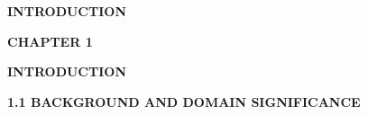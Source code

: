 \clearpage
{}
\setcounter{page}{1}
\pagestyle{fancy}
\fancyhf{}
\renewcommand{\headrulewidth}{0pt}
\cfoot{\fontsize{12pt}{14pt}\selectfont\thepage}

\vspace*{\fill}
\begin{center}
  {\fontsize{18pt}{24pt}\selectfont\bfseries INTRODUCTION\par}
\end{center}
\vspace*{\fill}
\newpage

\begin{center}
  {\fontsize{16pt}{20pt}\selectfont\bfseries CHAPTER 1\par}
  \vspace{0.3cm}
  {\fontsize{16pt}{20pt}\selectfont\bfseries INTRODUCTION\par}
\end{center}
\vspace{0.4cm}

{\fontsize{14pt}{18pt}\selectfont\bfseries 1.1 BACKGROUND AND DOMAIN SIGNIFICANCE\par}
\vspace{0.3cm}

